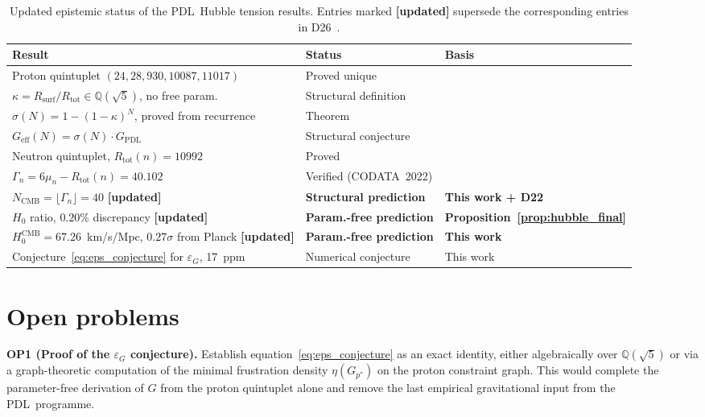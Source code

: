 \documentclass[11pt,a4paper]{article}
\theoremstyle{definition}
\newcommand{\PDL}{\textnormal{PDL}}
\newcommand{\Rsurf}{R_{\mathrm{surf}}}
\newcommand{\Rtot}{R_{\mathrm{tot}}}
\newcommand{\epsg}{\varepsilon_G}
\newcommand{\Geff}{G_{\mathrm{eff}}}
\newcommand{\GPDL}{G_{\mathrm{PDL}}}
\newcommand{\Hzero}{H_0}
\newcommand{\kap}{\kappa}
\newcommand{\sig}{\sigma}
\begin{document}
\begin{table}[ht]
\centering
\caption{Updated epistemic status of the \PDL\ Hubble tension results. Entries marked \textbf{[updated]} supersede the corresponding entries in D26~\cite{Hubble_Resolution_PDL_2026}.}
\label{tab:epistemic}
\bigskip
\begin{tabular}{p{6.5cm}p{3.0cm}p{4.5cm}}
\toprule
Result & Status & Basis \\
\midrule
Proton quintuplet $(24, 28, 930, 10087, 11017)$ & Proved unique & \cite{Combinatorial_Proton_v2_2026} \\
$\kap = \Rsurf/\Rtot \in \mathbb{Q}(\sqrt{5})$, no free param. & Structural definition & \cite{Golden_Ratio_PDL_2026,Hubble_Resolution_PDL_2026} \\
$\sig(N) = 1-(1-\kap)^N$, proved from recurrence & Theorem & \cite{Hubble_Resolution_PDL_2026} \\
$\Geff(N) = \sig(N)\cdot\GPDL$ & Structural conjecture & \cite{Hubble_Resolution_PDL_2026} \\
Neutron quintuplet, $\Rtot(n) = 10992$ & Proved & \cite{Nuclear_Stability_PDL_2026} \\
$\Gamma_n = 6\mu_n - \Rtot(n) = 40.102$ & Verified (CODATA~2022) & \cite{Nuclear_Stability_PDL_2026} \\
$N_{\mathrm{CMB}} = \lfloor\Gamma_n\rfloor = 40$ \textbf{[updated]} & \textbf{Structural prediction} & \textbf{This work + D22} \\
$\Hzero$ ratio, $0.20\%$ discrepancy \textbf{[updated]} & \textbf{Param.-free prediction} & \textbf{Proposition~\ref{prop:hubble_final}} \\
$\Hzero^{\mathrm{CMB}} = 67.26$~km/s/Mpc, $0.27\sigma$ from Planck \textbf{[updated]} & \textbf{Param.-free prediction} & \textbf{This work} \\
Conjecture~\eqref{eq:eps_conjecture} for $\epsg$, 17~ppm & Numerical conjecture & This work \\
\bottomrule
\end{tabular}
\end{table}

\section{Open problems}
\label{sec:open}

\medskip\noindent\textbf{OP1 (Proof of the $\epsg$ conjecture).} Establish equation~\eqref{eq:eps_conjecture} as an exact identity, either algebraically over $\mathbb{Q}(\sqrt{5})$ or via a graph-theoretic computation of the minimal frustration density $\eta(G_{p^*})$ on the proton constraint graph. This would complete the parameter-free derivation of $G$ from the proton quintuplet alone and remove the last empirical gravitational input from the \PDL\ programme.
\end{document}
